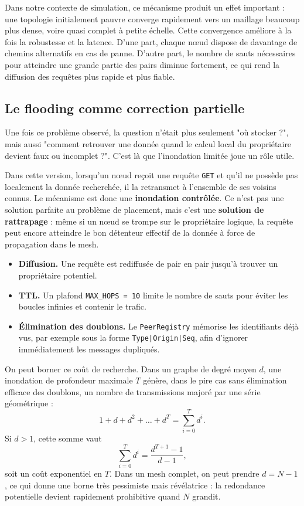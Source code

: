 Dans notre contexte de simulation, ce mécanisme produit un effet important : une topologie initialement pauvre converge rapidement vers un maillage beaucoup plus dense, voire quasi complet à petite échelle. Cette convergence améliore à la fois la robustesse et la latence. D'une part, chaque n\oe ud dispose de davantage de chemins alternatifs en cas de panne. D'autre part, le nombre de sauts nécessaires pour atteindre une grande partie des pairs diminue fortement, ce qui rend la diffusion des requêtes plus rapide et plus fiable.

\subsection{Le flooding comme correction partielle}

Une fois ce problème observé, la question n'était plus seulement "où stocker ?", mais aussi "comment retrouver une donnée quand le calcul local du propriétaire devient faux ou incomplet ?". C'est là que l'inondation limitée joue un rôle utile.

Dans cette version, lorsqu'un n\oe ud reçoit une requête \texttt{GET} et qu'il ne possède pas localement la donnée recherchée, il la retransmet à l'ensemble de ses voisins connus. Le mécanisme est donc une \textbf{inondation contrôlée}. Ce n'est pas une solution parfaite au problème de placement, mais c'est une \textbf{solution de rattrapage} : même si un n\oe ud se trompe sur le propriétaire logique, la requête peut encore atteindre le bon détenteur effectif de la donnée à force de propagation dans le mesh.

\begin{itemize}
    \item \textbf{Diffusion.} Une requête est rediffusée de pair en pair jusqu'à trouver un propriétaire potentiel.
    \item \textbf{TTL.} Un plafond \texttt{MAX\_HOPS = 10} limite le nombre de sauts pour éviter les boucles infinies et contenir le trafic.
    \item \textbf{Élimination des doublons.} Le \texttt{PeerRegistry} mémorise les identifiants déjà vus, par exemple sous la forme \texttt{Type|Origin|Seq}, afin d'ignorer immédiatement les messages dupliqués.
\end{itemize}

On peut borner ce coût de recherche. Dans un graphe de degré moyen \(d\), une inondation de profondeur maximale \(T\) génère, dans le pire cas sans élimination efficace des doublons, un nombre de transmissions majoré par une série géométrique :
\[
1 + d + d^2 + \dots + d^T = \sum_{i=0}^{T} d^i.
\]
Si \(d > 1\), cette somme vaut
\[
\sum_{i=0}^{T} d^i = \frac{d^{T+1}-1}{d-1},
\]
soit un coût exponentiel en \(T\). Dans un mesh complet, on peut prendre \(d = N-1\), ce qui donne une borne très pessimiste mais révélatrice : la redondance potentielle devient rapidement prohibitive quand \(N\) grandit.

